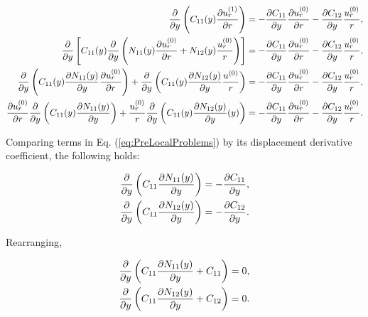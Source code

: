 \begin{equation}
    \begin{aligned} \label{eq:PreLocalProblems}
        \frac{\partial }{\partial y} \left( C_{11}(y) \frac{\partial u_r^{(1)}}{\partial r} \right) = -\frac{\partial C_{11}}{\partial y}\frac{\partial u_r^{(0)}}{\partial r} - \frac{\partial C_{12}}{\partial y}\frac{u_r^{(0)}}{r},\\
        \frac{\partial }{\partial y}\left[ C_{11}(y) \frac{\partial }{\partial y}\left( N_{11}(y) \frac{\partial u_r^{(0)}}{\partial r} + N_{12}(y)\frac{u_r^{(0)}}{r} \right) \right] = -\frac{\partial C_{11}}{\partial y}\frac{\partial u_r^{(0)}}{\partial r} - \frac{\partial C_{12}}{\partial y}\frac{u_r^{(0)}}{r},\\
        \frac{\partial }{\partial y} \left( C_{11}(y)\frac{\partial N_{11}(y)}{\partial y}\frac{\partial u_r^{(0)}}{\partial r} \right) +
        \frac{\partial }{\partial y} \left( C_{11}(y)\frac{\partial N_{12}(y)}{\partial y}\frac{u^{(0)}}{r} \right) = -\frac{\partial C_{11}}{\partial y}\frac{\partial u_r^{(0)}}{\partial r} - \frac{\partial C_{12}}{\partial y}\frac{u_r^{(0)}}{r},\\
       \frac{\partial u_r^{(0)}}{\partial r} \frac{\partial }{\partial y} \left( C_{11}(y)\frac{\partial N_{11}(y)}{\partial y} \right) +
       \frac{u_r^{(0)}}{r} \frac{\partial }{\partial y} \left( C_{11}(y)\frac{\partial N_{12}(y)}{\partial y}(y) \right) = 
       -\frac{\partial C_{11}}{\partial y}\frac{\partial u_r^{(0)}}{\partial r} - \frac{\partial C_{12}}{\partial y}\frac{u_r^{(0)}}{r}.
    \end{aligned}
\end{equation}

Comparing terms in Eq. (\ref{eq:PreLocalProblems}) by its displacement derivative coefficient, the following holds:

\begin{equation}
    \begin{aligned}
        \frac{\partial }{\partial y} \left( C_{11}\frac{\partial N_{11}(y)}{\partial y} \right) = -\frac{\partial C_{11}}{\partial y}, \\
        \frac{\partial }{\partial y} \left( C_{11}\frac{\partial N_{12}(y)}{\partial y} \right) = -\frac{\partial C_{12}}{\partial y}.
    \end{aligned}
\end{equation}

Rearranging,

\begin{equation} \label{eq:LocalProblems}
    \begin{aligned}
        \frac{\partial }{\partial y} \left( C_{11}\frac{\partial N_{11}(y)}{\partial y} + C_{11}\right) = 0, \\
        \frac{\partial }{\partial y} \left( C_{11}\frac{\partial N_{12}(y)}{\partial y} + C_{12}\right) = 0.
    \end{aligned}
\end{equation}

